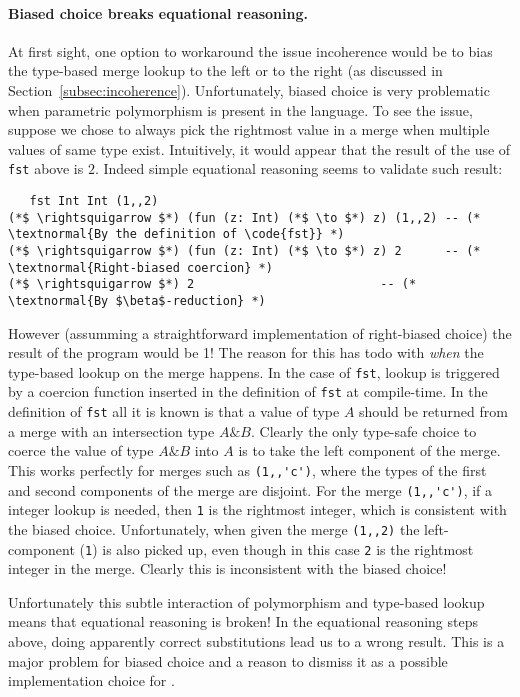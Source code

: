 \paragraph{Biased choice breaks equational reasoning.} At first sight, one option
to workaround the issue incoherence would be to bias the type-based merge lookup
to the left or to the right (as discussed in
Section~\ref{subsec:incoherence}). Unfortunately, biased choice is
very problematic when parametric polymorphism is present in the language.
To see the issue, suppose we chose to always pick the
rightmost value in a merge when multiple values of same type exist.
Intuitively, it would appear that the result of the use of
\lstinline{fst} above is $2$. Indeed simple equational reasoning
seems to validate such result:
\begin{lstlisting}
   fst Int Int (1,,2)
(*$ \rightsquigarrow $*) (fun (z: Int) (*$ \to $*) z) (1,,2) -- (* \textnormal{By the definition of \code{fst}} *)
(*$ \rightsquigarrow $*) (fun (z: Int) (*$ \to $*) z) 2      -- (* \textnormal{Right-biased coercion} *)
(*$ \rightsquigarrow $*) 2                          -- (* \textnormal{By $\beta$-reduction} *)
\end{lstlisting}

However (assumming a straightforward implementation of right-biased
choice) the result of the program would be 1! The reason for this has
todo with \emph{when} the type-based lookup on the merge happens. In
the case of \lstinline{fst}, lookup is triggered by a coercion
function inserted in the definition of \lstinline{fst} at
compile-time.
In the definition of \lstinline$fst$ all it is known is that a
value of type $A$ should be returned from a merge with an intersection
type $A\&B$.  Clearly the only type-safe choice to coerce the value of
type $A\&B$ into $A$ is to
take the left component of the merge. This works perfectly for merges
such as \lstinline$(1,,'c')$, where the types of the first and second components
of the merge are disjoint. For the merge \lstinline$(1,,'c')$, if a integer lookup
is needed, then \lstinline$1$ is the rightmost integer, which is consistent with the
biased choice. Unfortunately, when given the merge \lstinline$(1,,2)$ the
left-component (\lstinline$1$) is also picked up, even though in this case \lstinline$2$
is the rightmost integer in the merge. Clearly this is inconsistent
with the biased choice!

Unfortunately this subtle interaction of polymorphism and type-based lookup
 means that equational reasoning is broken!
In the equational reasoning steps above, doing apparently correct
substitutions lead us to a wrong result. This is a major problem for
biased choice and a reason to dismiss it as a possible implementation
choice for \namedis.

